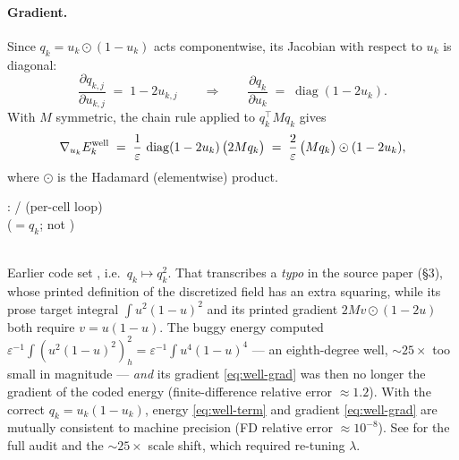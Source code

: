 \documentclass[11pt,a4paper]{article}
\begin{document}
\paragraph{Gradient.}
Since $q_k = u_k \odot (1-u_k)$ acts componentwise, its Jacobian with respect to
$u_k$ is diagonal:
\begin{equation}
  \frac{\partial q_{k,j}}{\partial u_{k,j}}
  \;=\; 1 - 2u_{k,j}
  \qquad\Longrightarrow\qquad
  \frac{\partial q_k}{\partial u_k} \;=\; \operatorname{diag}(1 - 2u_k).
  \label{eq:dq-du}
\end{equation}
With $M$ symmetric, the chain rule applied to $q_k^\top M q_k$ gives
\begin{equation}
  \nabla_{u_k} E^{\mathrm{well}}_k
  \;=\;
  \frac{1}{\varepsilon}\,\operatorname{diag}(1-2u_k)\,\big(2 M q_k\big)
  \;=\;
  \frac{2}{\varepsilon}\,\big(M q_k\big)\odot(1-2u_k),
  \label{eq:well-grad}
\end{equation}
where $\odot$ is the Hadamard (elementwise) product.

\begin{tcolorbox}[colback=blue!4!white, colframe=blue!40!black,
                  title={Code: double-well term and gradient (corrected)}, fontupper=\small]
:
 /  (per-cell loop)\\[2pt]
\hfill\textrm{\small ($=q_k$; not )}\\
\\
\end{tcolorbox}

\begin{remark}
\label{rem:bug}
Earlier code set , i.e.\ $q_k \mapsto q_k^2$.
That transcribes a \emph{typo} in the source paper \cite{bogosel2017partitions}
(\S3), whose printed definition of the discretized field has an extra squaring, while
its prose target integral $\int u^2(1-u)^2$ and its printed gradient
$2Mv\odot(1-2u)$ both require $v=u(1-u)$. The buggy energy computed
$\varepsilon^{-1}\!\int (u^2(1-u)^2)_h^2 = \varepsilon^{-1}\!\int u^4(1-u)^4$ --- an
eighth-degree well, $\sim\!25\times$ too small in magnitude --- \emph{and} its
gradient \eqref{eq:well-grad} was then no longer the gradient of the coded energy
(finite-difference relative error $\approx 1.2$). With the correct
$q_k=u_k(1-u_k)$, energy \eqref{eq:well-term} and gradient \eqref{eq:well-grad} are
mutually consistent to machine precision (FD relative error $\approx 10^{-8}$). See
 for the full audit
and the $\sim\!25\times$ scale shift, which required re-tuning $\lambda$.
\end{remark}
\end{document}

